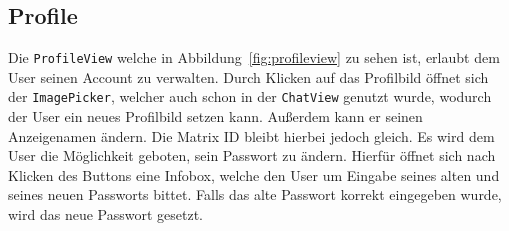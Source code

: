     \subsection{Profile}\label{subsec:profile}
    Die \texttt{ProfileView} welche in Abbildung~\ref{fig:profileview} zu sehen ist, erlaubt dem User seinen Account zu verwalten.
    Durch Klicken auf das Profilbild öffnet sich der \texttt{ImagePicker}, welcher auch schon in der \texttt{ChatView} genutzt wurde, wodurch der User ein neues Profilbild setzen kann.
    Außerdem kann er seinen Anzeigenamen ändern.
    Die Matrix ID bleibt hierbei jedoch gleich.
    Es wird dem User die Möglichkeit geboten, sein Passwort zu ändern.
    Hierfür öffnet sich nach Klicken des Buttons eine Infobox, welche den User um Eingabe seines alten und seines neuen Passworts bittet.
    Falls das alte Passwort korrekt eingegeben wurde, wird das neue Passwort gesetzt.\\

